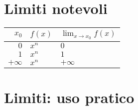 \section{Limiti notevoli}

\begin{tabular}{|r|l|l|}
\hline
$x_0$ & $f(x)$ & $\lim_{x \rightarrow x_0} f(x)$\\
\hline
\hline
$0$ 		& $x^n$ & $0$ \\
$1$ 		& $x^n$ & $1$ \\
$+\infty$ 	& $x^n$ & $+\infty$\\
\hline

\hline
\end{tabular}

\section{Limiti: uso pratico}

